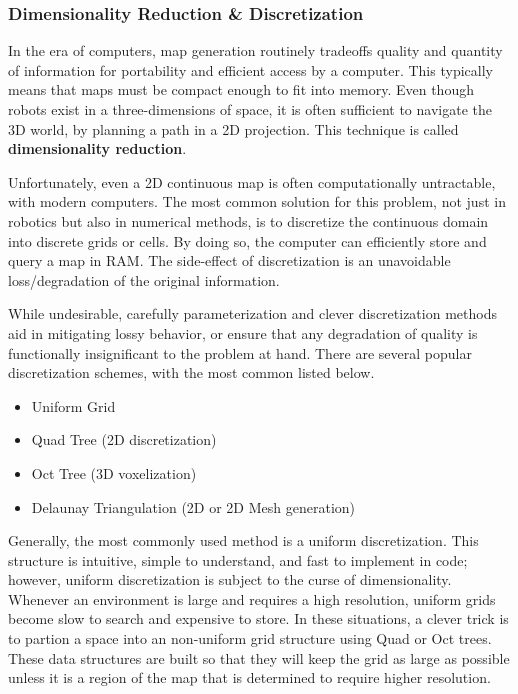 \subsubsection{Dimensionality Reduction \& Discretization}

In the era of computers, map generation routinely tradeoffs quality and quantity of information for portability and efficient access by a computer. This typically means that maps must be compact enough to fit into memory. Even though robots exist in a three-dimensions of space, it is often sufficient to navigate the 3D world, by planning a path in a 2D projection. This technique is called \textbf{dimensionality reduction}. 

Unfortunately, even a 2D continuous map is often computationally untractable, with modern computers. The most common solution for this problem, not just in robotics but also in numerical methods, is to discretize the continuous domain into discrete grids or cells. By doing so, the computer can efficiently store and query a map in RAM. The side-effect of discretization is an unavoidable loss/degradation of the original information.  


While undesirable, carefully parameterization and clever discretization methods aid in mitigating lossy behavior, or ensure that any degradation of quality is functionally insignificant to the problem at hand. There are several popular discretization schemes, with the most common listed below. 

\begin{itemize}
  \item Uniform Grid
  \item Quad Tree (2D discretization)
  \item Oct Tree (3D voxelization)
  \item Delaunay Triangulation (2D or 2D Mesh generation)
\end{itemize}


Generally, the most commonly used method is a uniform discretization. This structure is intuitive, simple to understand, and fast to implement in code; however, uniform discretization is subject to the curse of dimensionality. Whenever an environment is large and requires a high resolution, uniform grids become slow to search and expensive to store. In these situations, a clever trick is to partion a space into an non-uniform grid structure using Quad or Oct trees. These data structures are built so that they will keep the grid as large as possible unless it is a region of the map that is determined to require higher resolution. 

